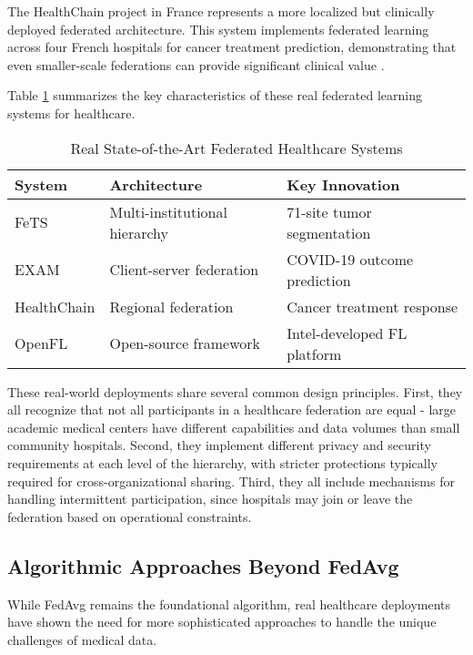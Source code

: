 \documentclass[3p,times,procedia]{elsarticle}
\begin{document}
The HealthChain project in France represents a more localized but clinically deployed federated architecture. This system implements federated learning across four French hospitals for cancer treatment prediction, demonstrating that even smaller-scale federations can provide significant clinical value \cite{Rieke2020}.

Table \ref{tab:real_sota_architectures} summarizes the key characteristics of these real federated learning systems for healthcare.

\begin{table}[htbp]
\centering
\caption{Real State-of-the-Art Federated Healthcare Systems}
\label{tab:real_sota_architectures}
\begin{tabular}{|l|l|l|}
\hline
\textbf{System} & \textbf{Architecture} & \textbf{Key Innovation} \\
\hline
FeTS & Multi-institutional hierarchy & 71-site tumor segmentation \\
\hline
EXAM & Client-server federation & COVID-19 outcome prediction \\
\hline
HealthChain & Regional federation & Cancer treatment response \\
\hline
OpenFL & Open-source framework & Intel-developed FL platform \\
\hline
\end{tabular}
\end{table}

These real-world deployments share several common design principles. First, they all recognize that not all participants in a healthcare federation are equal - large academic medical centers have different capabilities and data volumes than small community hospitals. Second, they implement different privacy and security requirements at each level of the hierarchy, with stricter protections typically required for cross-organizational sharing. Third, they all include mechanisms for handling intermittent participation, since hospitals may join or leave the federation based on operational constraints.

\subsection{Algorithmic Approaches Beyond FedAvg}

While FedAvg remains the foundational algorithm, real healthcare deployments have shown the need for more sophisticated approaches to handle the unique challenges of medical data.
\end{document}
